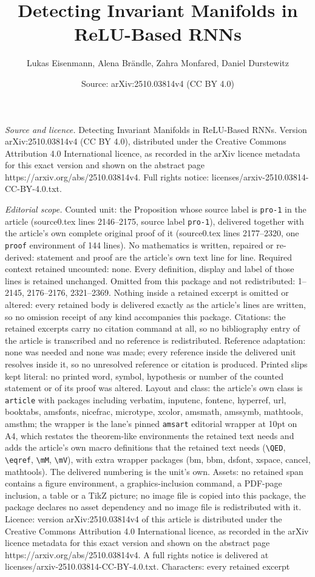 \documentclass[10pt,a4paper]{amsart}
\title[Detecting Invariant Manifolds in ReLU-Based RNNs]{Detecting Invariant Manifolds in ReLU-Based RNNs}
\author{Lukas Eisenmann, Alena Br\"andle, Zahra Monfared, Daniel Durstewitz}
\date{Source: arXiv:2510.03814v4 (CC BY 4.0)}
\begin{document}
\maketitle

\noindent\emph{Source and licence.} Detecting Invariant Manifolds in ReLU-Based RNNs. Version arXiv:2510.03814v4 (CC BY 4.0), distributed under the Creative Commons Attribution 4.0 International licence, as recorded in the arXiv licence metadata for this exact version and shown on the abstract page https://arxiv.org/abs/2510.03814v4. Full rights notice: licenses/arxiv-2510.03814-CC-BY-4.0.txt.\par\smallskip

\noindent\textit{Editorial scope.} Counted unit: the Proposition whose source label is \texttt{pro-1} in the article (source0.tex lines 2146--2175, source label \texttt{pro-1}), delivered together with the article's own complete original proof of it (source0.tex lines 2177--2320, one \texttt{proof} environment of 144 lines). No mathematics is written, repaired or re-derived: statement and proof are the article's own text line for line. Required context retained uncounted: none. Every definition, display and label of those lines is retained unchanged. Omitted from this package and not redistributed: 1--2145, 2176--2176, 2321--2369. Nothing inside a retained excerpt is omitted or altered: every retained body is delivered exactly as the article's lines are written, so no omission receipt of any kind accompanies this package. Citations: the retained excerpts carry no citation command at all, so no bibliography entry of the article is transcribed and no reference is redistributed. Reference adaptation: none was needed and none was made; every reference inside the delivered unit resolves inside it, so no unresolved reference or citation is produced. Printed slips kept literal: no printed word, symbol, hypothesis or number of the counted statement or of its proof was altered. Layout and class: the article's own class is \texttt{article} with packages including verbatim, inputenc, fontenc, hyperref, url, booktabs, amsfonts, nicefrac, microtype, xcolor, amsmath, amssymb, mathtools, amsthm; the wrapper is the lane's pinned \texttt{amsart} editorial wrapper at 10pt on A4, which restates the theorem-like environments the retained text needs and adds the article's own macro definitions that the retained text needs (\texttt{\textbackslash QED}, \texttt{\textbackslash eqref}, \texttt{\textbackslash mM}, \texttt{\textbackslash mV}), with extra wrapper packages (bm, bbm, dsfont, xspace, cancel, mathtools). The delivered numbering is the unit's own. Assets: no retained span contains a figure environment, a graphics-inclusion command, a PDF-page inclusion, a table or a TikZ picture; no image file is copied into this package, the package declares no asset dependency and no image file is redistributed with it. Licence: version arXiv:2510.03814v4 of this article is distributed under the Creative Commons Attribution 4.0 International licence, as recorded in the arXiv licence metadata for this exact version and shown on the abstract page https://arxiv.org/abs/2510.03814v4. A full rights notice is delivered at licenses/arxiv-2510.03814-CC-BY-4.0.txt. Characters: every retained excerpt 
\end{document}
